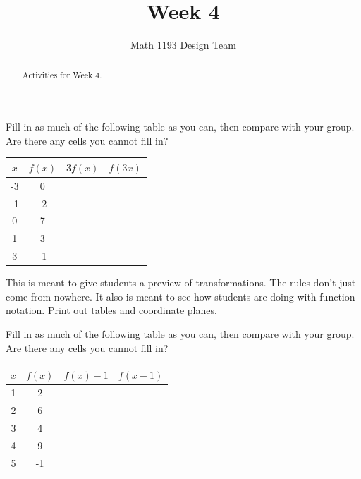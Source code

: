 \documentclass[noauthor,noinstructornotes]{ximera}
\title{Week 4}
\author{Math 1193 Design Team}
\begin{document}
\begin{abstract}
    Activities for Week 4.
\end{abstract}
\maketitle

\begin{problem}
Fill in as much of the following table as you can, then 
compare with your group. Are there any cells you cannot fill in?

\begin{center}
\begin{tabular}{|c|c|c|c|} 
 \hline
 \(x\) & \(f(x)\) & \(3f(x)\) & \(f(3x)\) \\
 \hline\hline
 -3 & 0 &  &  \\ 
 \hline
 -1 & -2 &  &  \\
 \hline
 0 & 7 &  &  \\
 \hline
 1 & 3 &  &  \\
 \hline
 3 & -1 &  &  \\
 \hline
\end{tabular}
\end{center}

\begin{instructorNotes}
This is meant to give students a preview of transformations. The rules don't
just come from nowhere. It also is meant to see how students are doing
with function notation. Print out tables and coordinate planes.
\end{instructorNotes}
\end{problem}

\begin{problem}
Fill in as much of the following table as you can, then 
compare with your group. Are there any cells you cannot fill in?

\begin{center}
\begin{tabular}{|c|c|c|c|} 
 \hline
 \(x\) & \(f(x)\) & \(f(x)-1\) & \(f(x - 1)\) \\
 \hline\hline
 1 & 2 &  &  \\ 
 \hline
 2 & 6 &  &  \\
 \hline
 3 & 4 &  &  \\
 \hline
 4 & 9 &  &  \\
 \hline
 5 & -1 &  &  \\
 \hline
\end{tabular}
\end{center}
\end{problem}
\end{document}
